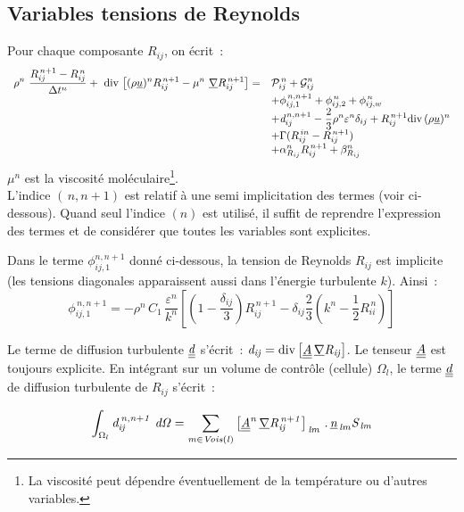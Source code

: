 \subsection*{\bf Variables tensions de Reynolds}
Pour chaque composante $R_{ij}$, on écrit~:
\begin{equation}\label{Base_Turrij_Eq_Temp_Rij}
\begin{array}{ll}
\displaystyle
\rho^n\ \frac {R_{ij}^{\,n+1}-R_{ij}^{\,n}}{\Delta t^n}
+\ \text{div}\,\left[ (\rho \underline{u})^{n} R_{ij}^{\,n+1}
- \mu^n\ \underline{\nabla}{R}_{ij}^{\,n+1} \right]
=  &
\displaystyle
\mathcal{P}^{\,n}_{ij}
+ \mathcal{G}^n_{ij} \\
&
\displaystyle
+ \phi^{\,n,n+1}_{ij,1} + \phi^{\,n}_{ij,2} + \phi^{\,n}_{ij,w} \\
&
\displaystyle
+ \text{\it{d}}^{\,n,n+1}_{ij}
- \displaystyle \frac{2}{3} \rho^n \varepsilon^n \delta_{ij}
+ R^{\,n+1}_{ij} \text{div}\,{(\rho \underline{u})^n} \\
&
\displaystyle
+ \Gamma(R^{\,in}_{ij} - R^{\,n+1}_{ij}) \\
&
\displaystyle
+ \alpha^n_{R_{ij}} R^{\,n+1}_{ij} + \beta^n_{R_{ij}}
\end{array}
\end{equation}
$\mu^n$ est la viscosité moléculaire\footnote{La viscosité peut
dépendre éventuellement de la température ou d'autres variables.}.\\
L'indice $(\,n,n+1)$ est relatif à une semi implicitation des termes (voir ci-dessous). Quand seul l'indice $(n)$ est utilisé, il suffit de reprendre l'expression des termes et de considérer que toutes les variables sont explicites.

Dans le terme $\phi^{n,n+1}_{ij,1}$ donné ci-dessous, la tension de Reynolds
 $R_{ij}$ est implicite (les tensions diagonales apparaissent aussi dans l'énergie
turbulente $k$). Ainsi~:
\begin{equation}
\displaystyle
\phi^{\,n,n+1}_{ij,1} = -\rho^n \,C_1\,\frac{\varepsilon^n}{k^n}\left[
(1-\frac{\delta_{ij}}{3}) R^{\,n+1}_{ij}- \delta_{ij} \frac{2}{3} (k^n-\frac{1}{2} R^{\,n}_{ii}) \right]
\end{equation}

Le terme de diffusion turbulente $\underline{\underline{\it{d}}}$ s'écrit~: $\it{d}_{ij} = \text{div}\,{\left[ \underline{\underline{A}}\,\underline{\nabla}{R}_{ij} \right]}$.
Le tenseur $\underline{\underline{A}}$ est toujours explicite.
En intégrant sur un volume de contr\^ole (cellule) $\Omega_l$, le terme $\underline{\underline{\it{d}}}$ de diffusion turbulente de $R_{ij}$ s'écrit~:

\begin{equation}
\displaystyle\int_{\Omega_l} \it{d}^{\,n,n+1}_{ij}\ d\Omega =
\sum\limits_{m\in
Vois(l)} \left[
\underline{\underline{A}}^n\,\underline{\nabla}{R}^{\,n+1}_{ij} \right]_{\,lm}\,.\,\underline{n}_{\,lm}S_{\,lm}
\end{equation}

